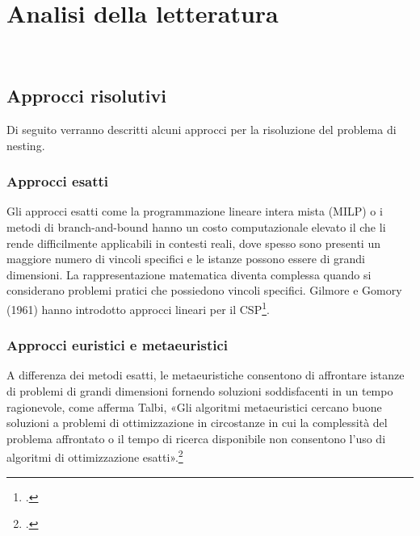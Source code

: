 \chapter{Analisi della letteratura}
\label{cap:descrizione-stage}

\\

\section{Approcci risolutivi}

Di seguito verranno descritti alcuni approcci per la risoluzione del problema di nesting.

\subsection{Approcci esatti}

Gli approcci esatti come la programmazione lineare intera mista (MILP) o i metodi di branch-and-bound hanno un costo computazionale elevato il che li rende difficilmente applicabili in contesti reali, dove spesso sono presenti un maggiore numero di vincoli specifici e le istanze possono essere di grandi dimensioni. La rappresentazione matematica diventa complessa quando si considerano problemi pratici che possiedono vincoli specifici.
Gilmore e Gomory (1961) hanno introdotto approcci lineari per il CSP\footcite{gilmore:linear-programming}.

\subsection{Approcci euristici e metaeuristici}

A differenza dei metodi esatti, le metaeuristiche consentono di affrontare istanze di problemi di grandi dimensioni fornendo soluzioni soddisfacenti in un tempo ragionevole, come afferma Talbi, «Gli algoritmi metaeuristici cercano buone soluzioni a problemi di ottimizzazione in circostanze in cui la complessità del problema affrontato o il tempo di ricerca disponibile non consentono l'uso di algoritmi di ottimizzazione esatti».\footcite{talbi:metaheuristics}

